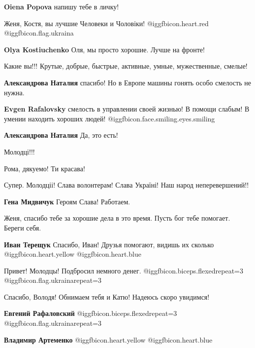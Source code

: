 \begin{itemize}
\textbf{Oiena Popova} напишу тебе в личку!

Женя, Костя, вы лучшие
Человеки и Чоловіки! @igg{fbicon.heart.red} @igg{fbicon.flag.ukraina}

\textbf{Olya Kostiuchenko} Оля, мы просто хорошие. Лучше на фронте!

Какие вы!!! Крутые, добрые, быстрые, активные, умные, мужественные, смелые!

\begin{itemize} %
\textbf{Александрова Наталия} спасибо! Но в Европе машины гонять особо смелость не нужна.

\textbf{Evgen Rafalovsky} смелость в управлении своей жизнью! В помощи слабым! В умении находить хороших людей!  @igg{fbicon.face.smiling.eyes.smiling} 

\textbf{Александрова Наталия} Да, это есть!
\end{itemize} %

Молодці!!!

Рома, дякуемо! Ти красава!

Супер. Молодціі! Слава волонтерам! Слава Україні! Наш народ неперевершений!!

\textbf{Гена Мидвичук} Героям Слава! Работаем.

Женя, спасибо тебе за хорошие дела в это время. Пусть бог тебе помогает. Береги себя.

\textbf{Иван Терещук} Спасибо, Иван! Друзья помогают, видишь их сколько @igg{fbicon.heart.yellow}  @igg{fbicon.heart.blue} 

Привет! Молодцы! Подбросил немного денег. @igg{fbicon.biceps.flexed}{repeat=3}  @igg{fbicon.flag.ukraina}{repeat=3}

\begin{itemize} %
Спасибо, Володя! Обнимаем тебя и Катю! Надеюсь скоро увидимся!

\textbf{Евгений Рафаловский}  @igg{fbicon.biceps.flexed}{repeat=3}  @igg{fbicon.flag.ukraina}{repeat=3}

\textbf{Владимир Артеменко}  @igg{fbicon.heart.yellow}  @igg{fbicon.heart.blue} 
\end{itemize} %


\end{itemize}
